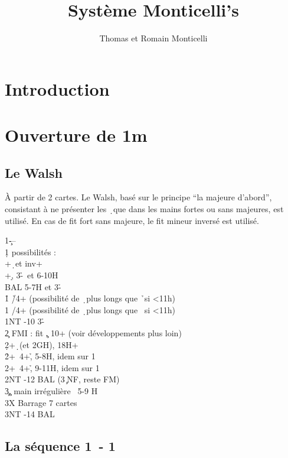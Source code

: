 \documentclass[a4paper]{article}
\title{Système Monticelli's}
\author{Thomas et Romain Monticelli}
\begin{document}
\maketitle
\tableofcontents

\section{Introduction}

\section{Ouverture de 1m}

\subsection{Le Walsh}

À partir de 2 cartes. Le Walsh, basé sur le principe ``la majeure d'abord'', consistant à ne présenter les \d\ que dans les mains fortes ou sans majeures, est utilisé.
En cas de fit fort sans majeure, le fit mineur inversé est utilisé.

\begin{bidtable}
1\c---\\
1\d {} possibilités :\\
+\d\ et inv+\\
+\d , 3-\h \s\ et 6-10H\\
\>BAL 5-7H et 3-\h \s \\
1\h \> \h /4+ (possibilité de \d\ plus longs que \h\ si <11h)\\
1\s \> \s /4+ (possibilité de \d\ plus longs que \s\ si <11h)\\
1NT -10 3-\h \s \\
2\c \> FMI : fit \c , 10+ (voir développements plus loin)\\
2\d {}+\d\ (et 2GH), 18H+\\
2\h {}+\s\ 4+\h , 5-8H, idem sur 1\d \\
2\s {}+\s\ 4+\h , 9-11H, idem sur 1\d \\
2NT	 -12 BAL (3\c\ NF, reste FM)\\
3\c	 {}\c , main irrégulière ~5-9 H\\
3X	 \> Barrage 7 cartes\\
3NT	 -14 BAL
\end{bidtable}

\subsection{La séquence 1\pdfc\ - 1\pdfd}
\end{document}
